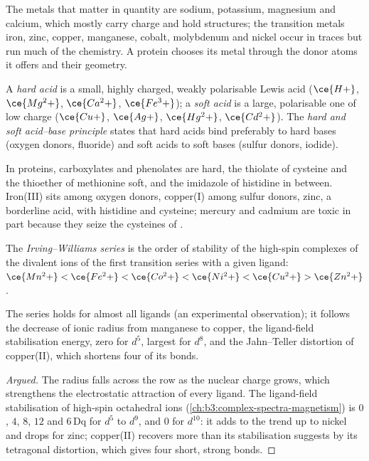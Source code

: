 The metals that matter in quantity are sodium, potassium, magnesium and
calcium, which mostly carry charge and hold structures; the transition metals
iron, zinc, copper, manganese, cobalt, molybdenum and nickel occur in traces
but run much of the chemistry. A protein chooses its metal through the donor
atoms it offers and their geometry.

\begin{definition}\label{def:b3:bioinorganic:hsab}
A \emph{hard acid} is a small, highly charged, weakly
polarisable Lewis acid ($\ce{H+}$, $\ce{Mg^2+}$, $\ce{Ca^2+}$, $\ce{Fe^3+}$); a \emph{soft
acid} is a large, polarisable one of low charge ($\ce{Cu+}$, $\ce{Ag+}$,
$\ce{Hg^2+}$, $\ce{Cd^2+}$). The \emph{hard and soft acid--base principle}
states that hard acids bind preferably to hard bases
(oxygen donors, fluoride) and soft acids to soft bases (sulfur donors, iodide).
\end{definition}

In proteins, carboxylates and phenolates are hard, the thiolate of cysteine and
the thioether of methionine soft, and the imidazole of histidine in between. Iron(III)
sits among oxygen donors, copper(I) among sulfur donors, zinc, a borderline
acid, with histidine and cysteine; mercury and cadmium are toxic in part
because they seize the cysteines of .

\begin{definition}\label{def:b3:bioinorganic:irving-williams}
The \emph{Irving--Williams series} is the order
of stability of the high-spin complexes of the divalent ions of the first
transition series with a given ligand:
$\ce{Mn^2+} < \ce{Fe^2+} < \ce{Co^2+} < \ce{Ni^2+} < \ce{Cu^2+} > \ce{Zn^2+}$.
\end{definition}

\begin{proposition}\label{prop:b3:bioinorganic:irving-williams}
The series holds for almost all ligands (an experimental observation); it
follows the decrease of ionic radius from manganese to copper, the ligand-field
stabilisation energy, zero for $d^5$, largest for $d^8$, and the Jahn--Teller
distortion of copper(II), which shortens four of its bonds.
\end{proposition}

\begin{proof}[Argued]
The radius falls across the row as the nuclear charge grows, which strengthens
the electrostatic attraction of every ligand. The ligand-field stabilisation of
high-spin octahedral ions (\cref{ch:b3:complex-spectra-magnetism}) is $0$, $4$,
$8$, $12$ and $6\,\mathrm{Dq}$ for $d^5$ to $d^9$, and $0$ for $d^{10}$: it adds to the trend up to nickel and
drops for zinc; copper(II) recovers more than its stabilisation suggests by
its tetragonal distortion, which gives four short, strong bonds.
\end{proof}

